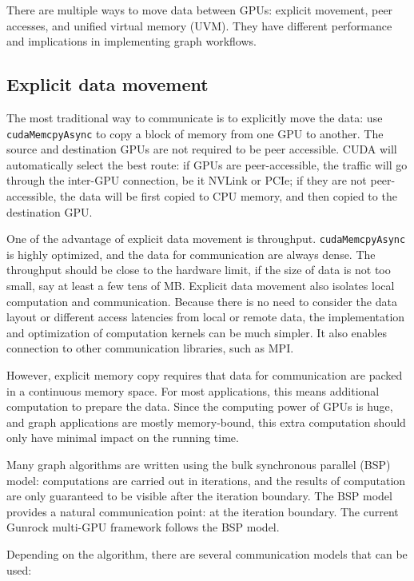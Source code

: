 \documentclass[10pt,oneside]{memoir}
\begin{document}
There are multiple ways to move data between GPUs: explicit movement,
peer accesses, and unified virtual memory (UVM). They have different
performance and implications in implementing graph workflows.

\hypertarget{explicit-data-movement}{%
\subsection{Explicit data movement}\label{explicit-data-movement}}

The most traditional way to communicate is to explicitly move the data:
use \texttt{cudaMemcpyAsync} to copy a block of memory from one GPU to
another. The source and destination GPUs are not required to be peer
accessible. CUDA will automatically select the best route: if GPUs are
peer-accessible, the traffic will go through the inter-GPU connection,
be it NVLink or PCIe; if they are not peer-accessible, the data will be
first copied to CPU memory, and then copied to the destination GPU.

One of the advantage of explicit data movement is throughput.
\texttt{cudaMemcpyAsync} is highly optimized, and the data for
communication are always dense. The throughput should be close to the
hardware limit, if the size of data is not too small, say at least a few
tens of MB. Explicit data movement also isolates local computation and
communication. Because there is no need to consider the data layout or
different access latencies from local or remote data, the implementation
and optimization of computation kernels can be much simpler. It also
enables connection to other communication libraries, such as MPI.

However, explicit memory copy requires that data for communication are
packed in a continuous memory space. For most applications, this means
additional computation to prepare the data. Since the computing power of
GPUs is huge, and graph applications are mostly memory-bound, this extra
computation should only have minimal impact on the running time.

Many graph algorithms are written using the bulk synchronous parallel
(BSP) model: computations are carried out in iterations, and the results
of computation are only guaranteed to be visible after the iteration
boundary. The BSP model provides a natural communication point: at the
iteration boundary. The current Gunrock multi-GPU framework follows the
BSP model.

Depending on the algorithm, there are several communication models that
can be used:
\end{document}
